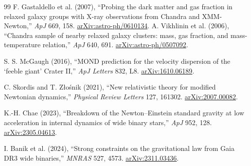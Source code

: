 \begin{thebibliography}{99}
 F. Gastaldello et al. (2007), ``Probing the dark
matter and gas fraction in relaxed galaxy groups with X-ray observations from
Chandra and XMM-Newton,'' \emph{ApJ} 669, 158.
\href{https://arxiv.org/abs/astro-ph/0610134}{arXiv:astro-ph/0610134}.
 A. Vikhlinin et al. (2006), ``Chandra sample of nearby
relaxed galaxy clusters: mass, gas fraction, and mass-temperature relation,''
\emph{ApJ} 640, 691. \href{https://arxiv.org/abs/astro-ph/0507092}{arXiv:astro-ph/0507092}.

 S. S. McGaugh (2016), ``MOND prediction for the velocity
dispersion of the `feeble giant' Crater II,'' \emph{ApJ Letters} 832, L8.
\href{https://arxiv.org/abs/1610.06189}{arXiv:1610.06189}.

 C. Skordis and T. Z{\l}o\'snik (2021), ``New relativistic
theory for modified Newtonian dynamics,'' \emph{Physical Review Letters} 127,
161302. \href{https://arxiv.org/abs/2007.00082}{arXiv:2007.00082}.

 K.-H. Chae (2023), ``Breakdown of the Newton--Einstein
standard gravity at low acceleration in internal dynamics of wide binary
stars,'' \emph{ApJ} 952, 128. \href{https://arxiv.org/abs/2305.04613}{arXiv:2305.04613}.

 I. Banik et al. (2024), ``Strong constraints on the
gravitational law from Gaia DR3 wide binaries,'' \emph{MNRAS} 527, 4573.
\href{https://arxiv.org/abs/2311.03436}{arXiv:2311.03436}.

\end{thebibliography}
